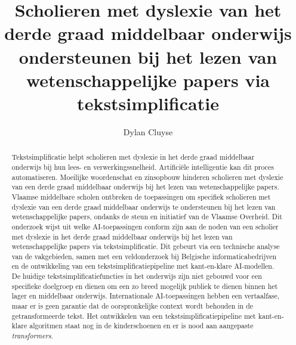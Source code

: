 \documentclass{hogent-article}
\title{Scholieren met dyslexie van het derde graad middelbaar onderwijs ondersteunen bij het lezen van wetenschappelijke papers via tekstsimplificatie}
\author{Dylan Cluyse}
\begin{document}
\begin{abstract}
Tekstsimplificatie helpt scholieren met dyslexie in het derde graad middelbaar onderwijs bij hun lees- en verwerkingssnelheid. Artificiële intelligentie kan dit proces automatiseren. Moeilijke woordenschat en zinsopbouw hinderen scholieren met dyslexie van een derde graad middelbaar onderwijs bij het lezen van wetenschappelijke papers. Vlaamse middelbare scholen ontbreken de toepassingen om specifiek scholieren met dyslexie van een derde graad middelbaar onderwijs te ondersteunen bij het lezen van wetenschappelijke papers, ondanks de steun en initiatief van de Vlaamse Overheid. Dit onderzoek wijst uit welke AI-toepassingen conform zijn aan de noden van een scholier met dyslexie in het derde graad middelbaar onderwijs bij het lezen van wetenschappelijke papers via tekstsimplificatie.  Dit gebeurt via een technische analyse van de vakgebieden, samen met een veldonderzoek bij Belgische informaticabedrijven en de ontwikkeling van een tekstsimplificatiepipeline met kant-en-klare AI-modellen. De huidige tekstsimplificatiefuncties in het onderwijs zijn niet gebouwd voor een specifieke doelgroep en dienen om een zo breed mogelijk publiek te dienen binnen het lager en middelbaar onderwijs. Internationale AI-toepassingen hebben een vertaalfase, maar er is geen garantie dat de oorspronkelijke context wordt behouden in de getransformeerde tekst. Het ontwikkelen van een tekstsimplificatiepipeline met kant-en-klare algoritmen staat nog in de kinderschoenen en er is nood aan aangepaste \textit{transformers}.
\end{abstract}

\tableofcontents



\printbibliography[heading=bibintoc]
\end{document}

